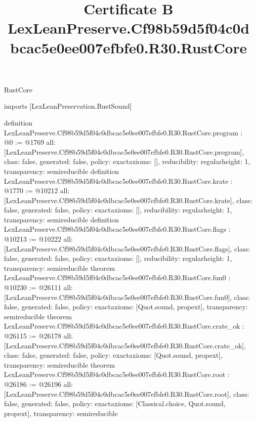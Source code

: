 \begin{lexlean}{RustCore}
\title{Certificate B LexLeanPreserve.Cf98b59d5f04c0dbcac5e0ee007efbfe0.R30.RustCore}
\begin{coremodule}
imports [LexLeanPreservation.RustSound]

definition LexLeanPreserve.Cf98b59d5f04c0dbcac5e0ee007efbfe0.R30.RustCore.program : @0 := @1769 {
  all: [LexLeanPreserve.Cf98b59d5f04c0dbcac5e0ee007efbfe0.R30.RustCore.program],
  class: false,
  generated: false,
  policy: exact{axioms: []},
  reducibility: regular{height: 1},
  transparency: semireducible
}
definition LexLeanPreserve.Cf98b59d5f04c0dbcac5e0ee007efbfe0.R30.RustCore.krate : @1770 := @10212 {
  all: [LexLeanPreserve.Cf98b59d5f04c0dbcac5e0ee007efbfe0.R30.RustCore.krate],
  class: false,
  generated: false,
  policy: exact{axioms: []},
  reducibility: regular{height: 1},
  transparency: semireducible
}
definition LexLeanPreserve.Cf98b59d5f04c0dbcac5e0ee007efbfe0.R30.RustCore.flags : @10213 := @10222 {
  all: [LexLeanPreserve.Cf98b59d5f04c0dbcac5e0ee007efbfe0.R30.RustCore.flags],
  class: false,
  generated: false,
  policy: exact{axioms: []},
  reducibility: regular{height: 1},
  transparency: semireducible
}
theorem LexLeanPreserve.Cf98b59d5f04c0dbcac5e0ee007efbfe0.R30.RustCore.fun0 : @10230 := @26111 {
  all: [LexLeanPreserve.Cf98b59d5f04c0dbcac5e0ee007efbfe0.R30.RustCore.fun0],
  class: false,
  generated: false,
  policy: exact{axioms: [Quot.sound, propext]},
  transparency: semireducible
}
theorem LexLeanPreserve.Cf98b59d5f04c0dbcac5e0ee007efbfe0.R30.RustCore.crate_ok : @26115 := @26178 {
  all: [LexLeanPreserve.Cf98b59d5f04c0dbcac5e0ee007efbfe0.R30.RustCore.crate_ok],
  class: false,
  generated: false,
  policy: exact{axioms: [Quot.sound, propext]},
  transparency: semireducible
}
theorem LexLeanPreserve.Cf98b59d5f04c0dbcac5e0ee007efbfe0.R30.RustCore.root : @26186 := @26196 {
  all: [LexLeanPreserve.Cf98b59d5f04c0dbcac5e0ee007efbfe0.R30.RustCore.root],
  class: false,
  generated: false,
  policy: exact{axioms: [Classical.choice, Quot.sound, propext]},
  transparency: semireducible
}


\end{coremodule}
\end{lexlean}
